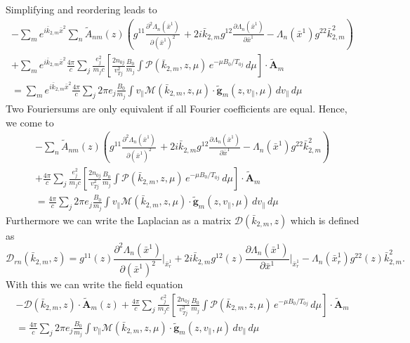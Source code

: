 Simplifying and reordering leads to
\begin{multline*}
  -\sum_m e^{i\bar{k}_{2,m}\bar x^2} \sum_n \tilde{A}_{nm}(z) \left(
    g^{11}\frac{\partial^2\Lambda_n(\bar x^1)}{\partial(\bar x^1)^2}\,
    +2i\bar{k}_{2,m} g^{12}\frac{\partial\Lambda_n(\bar x^1)}{\partial\bar x^1}
    -\Lambda_n(\bar x^1) g^{22}\bar{k}_{2,m}^2
  \right) \\
  +\sum_m e^{i\bar k_{2,m}\bar x^2} \frac{4\pi}{c}\sum_j\frac{e_j^2}{m_jc} 
  \left[\frac{2n_{0j}}{v_{Tj}^2}\frac{B_0}{m_j}\int \mathcal{P}(\bar{k}_{2,m},z,\mu)
    \,e^{-\mu B_0/T_{0j}}\,d\mu\right] \cdot\tilde{\mathbf{A}}_m\\
  = \sum_m e^{i\bar k_{2,m}\bar x^2}\frac{4\pi}{c}\sum_j 2\pi e_j \frac{B_0}{m_j}\int v_\| 
   \mathcal{M}(\bar{k}_{2,m},z,\mu)\cdot\tilde{\mathbf{g}}_m(z,v_\|,\mu)\,dv_\|\,d\mu
\end{multline*}
Two Fouriersums are only equivalent if all Fourier coefficients are
equal. Hence, we come to
\begin{multline*}
  -\sum_n \tilde{A}_{nm}(z) \left(
    g^{11}\frac{\partial^2\Lambda_n(\bar x^1)}{\partial(\bar x^1)^2}\,
    +2i\bar{k}_{2,m} g^{12}\frac{\partial\Lambda_n(\bar x^1)}{\partial\bar x^1}
    -\Lambda_n(\bar x^1) g^{22}\bar{k}_{2,m}^2
  \right) \\
  + \frac{4\pi}{c}\sum_j\frac{e_j^2}{m_jc} 
  \left[\frac{2n_{0j}}{v_{Tj}^2}\frac{B_0}{m_j}\int \mathcal{P}(\bar{k}_{2,m},z,\mu)
    \,e^{-\mu B_0/T_{0j}}\,d\mu\right] \cdot\tilde{\mathbf{A}}_m\\
  = \frac{4\pi}{c}\sum_j 2\pi e_j \frac{B_0}{m_j}\int v_\| 
   \mathcal{M}(\bar{k}_{2,m},z,\mu)\cdot\tilde{\mathbf{g}}_m(z,v_\|,\mu)\,dv_\|\,d\mu
\end{multline*}
Furthermore we can write the Laplacian as a matrix $\mathcal{D}(\bar
k_{2,m},z)$ which is defined as
\begin{displaymath}
  \mathcal{D}_{rn}(\bar k_{2,m},z) = 
  g^{11}(z)\frac{\partial^2\Lambda_n(\bar x^1)}{\partial(\bar x^1)^2}\Bigg|_{\bar x^1_r}
  +2i\bar{k}_{2,m} g^{12}(z)\frac{\partial\Lambda_n(\bar x^1)}{\partial\bar x^1}\Bigg|_{\bar x^1_r}
  -\Lambda_n(\bar x^1_r) g^{22}(z)\bar{k}_{2,m}^2.
\end{displaymath}
With this we can write the field equation 
\begin{multline*}
  -\mathcal{D}(\bar k_{2,m},z)\cdot \tilde{\mathbf{A}}_m(z)
  + \frac{4\pi}{c}\sum_j\frac{e_j^2}{m_jc} 
  \left[\frac{2n_{0j}}{v_{Tj}^2}\frac{B_0}{m_j}\int \mathcal{P}(\bar{k}_{2,m},z,\mu)
    \,e^{-\mu B_0/T_{0j}}\,d\mu\right] \cdot\tilde{\mathbf{A}}_m\\
  = \frac{4\pi}{c}\sum_j 2\pi e_j \frac{B_0}{m_j}\int v_\| 
   \mathcal{M}(\bar{k}_{2,m},z,\mu)\cdot\tilde{\mathbf{g}}_m(z,v_\|,\mu)\,dv_\|\,d\mu
\end{multline*}

